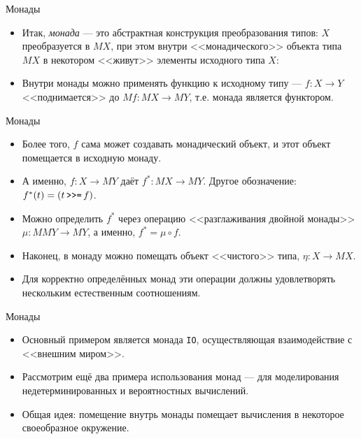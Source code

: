 \documentclass[xcolor=dvipsnames]{beamer}
\newcommand{\bind}{\mathop{\mbox{\tt {>}>=}}}
\begin{document}
\begin{frame}{Монады}
 \begin{itemize}[<+->]
  \item Итак, {\em монада} --- это абстрактная конструкция преобразования типов: $X$ преобразуется в $MX$, при этом внутри <<монадического>> объекта типа $MX$ в некотором <<живут>> элементы исходного типа $X$:
  \begin{center}
\end{center}
\item Внутри монады можно применять функцию к исходному типу --- $f \colon X \to Y$ <<поднимается>> до $Mf \colon MX \to MY$, т.е. монада является функтором.
 \end{itemize}

 
\end{frame}

\begin{frame}{Монады}
 
 \begin{itemize}[<+->]
  \item Более того, $f$ сама может создавать монадический объект, и этот объект помещается в исходную монаду.
  \item А именно, $f \colon X \to MY$ даёт $f^* \colon MX \to MY$. Другое обозначение:
  $f^*(t) = (t \bind f)$.
  \item Можно определить $f^*$ через операцию <<разглаживания двойной монады>> $\mu \colon MMY \to MY$, а именно, $f^* = \mu \circ f$.
  \item Наконец, в монаду можно помещать объект <<чистого>> типа, $\eta \colon X \to MX$.
  \item Для корректно определённых монад эти операции должны удовлетворять нескольким естественным соотношениям.
 \end{itemize}

 
\end{frame}


\begin{frame}{Монады}
 
 \begin{itemize}[<+->]
  \item Основный примером является монада \texttt{IO}, осуществляющая взаимодействие с <<внешним миром>>.
  \item Рассмотрим ещё два примера использования монад --- для моделирования недетерминированных и вероятностных вычислений.
  \item Общая идея: помещение внутрь монады помещает вычисления в некоторое своеобразное окружение.
 \end{itemize}

\end{frame}
\end{document}
